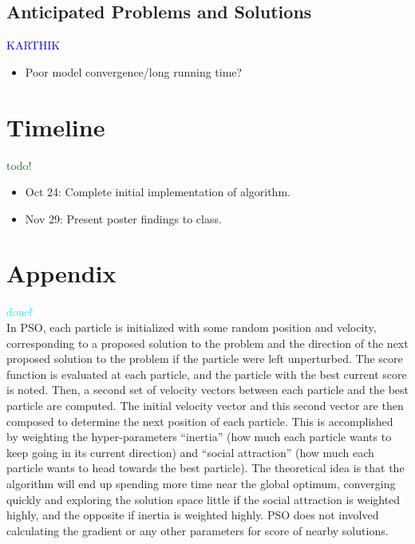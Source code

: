 \documentclass{article}
\begin{document}
\subsection{Anticipated Problems and Solutions}
\textcolor{blue}{KARTHIK} \\
\begin{itemize}
	\item Poor model convergence/long running time?
\end{itemize}
\pagebreak
\section{Timeline}
\textcolor{green}{todo!} \\
\begin{itemize}
	\item Oct 24: Complete initial implementation of algorithm.
	\item Nov 29: Present poster findings to class.
\end{itemize}
\pagebreak
\section{Appendix}
\textcolor{cyan}{done!} \\
In PSO, each particle is initialized with some random position and velocity, corresponding to a proposed solution to the problem and the direction of the next proposed solution to the problem if the particle were left unperturbed. The score function is evaluated at each particle, and the particle with the best current score is noted. Then, a second set of velocity vectors between each particle and the best particle are computed. The initial velocity vector and this second vector are then composed to determine the next position of each particle. This is accomplished by weighting the hyper-parameters ``inertia'' (how much each particle wants to keep going in its current direction) and ``social attraction'' (how much each particle wants to head towards the best particle). The theoretical idea is that the algorithm will end up spending more time near the global optimum, converging quickly and exploring the solution space little if the social attraction is weighted highly, and the opposite if inertia is weighted highly. PSO does not involved calculating the gradient or any other parameters for score of nearby solutions.
  
\end{document}
